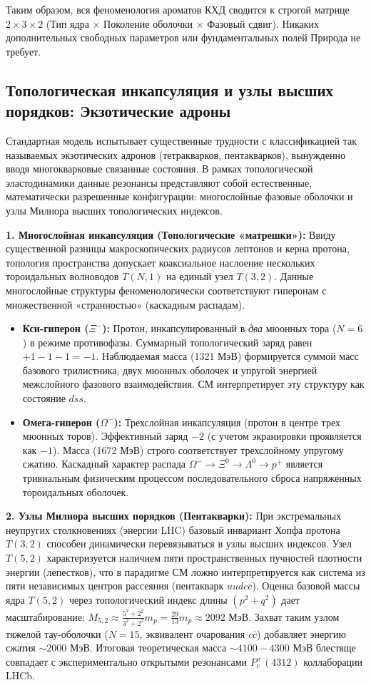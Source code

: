 \documentclass[11pt,a4paper]{article}
\begin{document}
Таким образом, вся феноменология ароматов КХД сводится к строгой матрице $2 \times 3 \times 2$ (Тип ядра $\times$ Поколение оболочки $\times$ Фазовый сдвиг). Никаких дополнительных свободных параметров или фундаментальных полей Природа не требует.

\subsection{Топологическая инкапсуляция и узлы высших порядков: Экзотические адроны}
Стандартная модель испытывает существенные трудности с классификацией так называемых экзотических адронов (тетракварков, пентакварков), вынужденно вводя многокварковые связанные состояния. В рамках топологической эластодинамики данные резонансы представляют собой естественные, математически разрешенные конфигурации: многослойные фазовые оболочки и узлы Милнора высших топологических индексов.

\textbf{1. Многослойная инкапсуляция (Топологические «матрешки»):}
Ввиду существенной разницы макроскопических радиусов лептонов и керна протона, топология пространства допускает коаксиальное наслоение нескольких тороидальных волноводов $T(N,1)$ на единый узел $T(3,2)$. Данные многослойные структуры феноменологически соответствуют гиперонам с множественной «странностью» (каскадным распадам).
\begin{itemize}
    \item \textbf{Кси-гиперон ($\Xi^-$):} Протон, инкапсулированный в \textit{два} мюонных тора ($N=6$) в режиме противофазы. Суммарный топологический заряд равен $+1 - 1 - 1 = -1$. Наблюдаемая масса (1321 МэВ) формируется суммой масс базового трилистника, двух мюонных оболочек и упругой энергией межслойного фазового взаимодействия. СМ интерпретирует эту структуру как состояние $dss$.
    \item \textbf{Омега-гиперон ($\Omega^-$):} Трехслойная инкапсуляция (протон в центре трех мюонных торов). Эффективный заряд $-2$ (с учетом экранировки проявляется как $-1$). Масса (1672 МэВ) строго соответствует трехслойному упругому сжатию. Каскадный характер распада $\Omega^- \to \Xi^0 \to \Lambda^0 \to p^+$ является тривиальным физическим процессом последовательного сброса напряженных тороидальных оболочек.
\end{itemize}

\textbf{2. Узлы Милнора высших порядков (Пентакварки):}
При экстремальных неупругих столкновениях (энергии LHC) базовый инвариант Хопфа протона $T(3,2)$ способен динамически перевязываться в узлы высших индексов. Узел $T(5,2)$ характеризуется наличием пяти пространственных пучностей плотности энергии (лепестков), что в парадигме СМ ложно интерпретируется как система из пяти независимых центров рассеяния (пентакварк $uudc\bar{c}$). 
Оценка базовой массы ядра $T(5,2)$ через топологический индекс длины $(p^2+q^2)$ дает масштабирование: $M_{5,2} \approx \frac{5^2+2^2}{3^2+2^2} m_p = \frac{29}{13} m_p \approx 2092$ МэВ. Захват таким узлом тяжелой тау-оболочки ($N=15$, эквивалент очарования $c\bar{c}$) добавляет энергию сжатия $\sim 2000$ МэВ. Итоговая теоретическая масса $\sim 4100-4300$ МэВ блестяще совпадает с экспериментально открытыми резонансами $P_c^+(4312)$ коллаборации LHCb.
\end{document}
